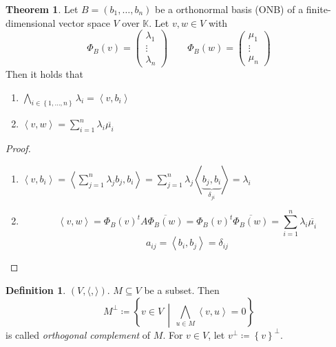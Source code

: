 \documentclass[a4paper,landscape,twocolumn]{article}
\newcommand\set[1]{\left\{#1\right\}}
\newcommand\setdef[2]{\left\{#1\,\middle|\,#2\right\}}
\newcommand\functional[1]{\left\langle{#1}\right\rangle}
\theoremstyle{definition}
\newtheorem{theorem}{Theorem}
\newtheorem{defi}{Definition}
\begin{document}
\begin{theorem}
  \label{satz-8.39}
  Let $B = (b_1, \ldots, b_n)$ be a orthonormal basis (ONB)
  of a finite-dimensional vector space $V$ over $\mathbb K$.
  Let $v,w \in V$ with
  \[
    \Phi_B(v) = \begin{pmatrix} \lambda_1 \\ \vdots \\ \lambda_n \end{pmatrix}
    \qquad
    \Phi_B(w) = \begin{pmatrix} \mu_1 \\ \vdots \\ \mu_n \end{pmatrix}
  \]
  Then it holds that
  \begin{enumerate}
    \item $\bigwedge_{i \in \set{1,\ldots,n}} \lambda_i = \functional{v,b_i}$
    \item $\functional{v,w} = \sum_{i=1}^n \lambda_i \overline{\mu_i}$
  \end{enumerate}
\end{theorem}
\begin{proof}
  \begin{enumerate}
    \item $\functional{v,b_i} = \functional{\sum_{j=1}^n \lambda_j b_j, b_i} = \sum_{j=1}^n \lambda_j \functional{\underbrace{b_j, b_i}_{\delta_{ji}}} = \lambda_i$
    \item
      \[
        \functional{v,w} = \Phi_B(v)^t A \overline{\Phi_B(w)} = \Phi_B(v)^t \overline{\Phi_B(w)} = \sum_{i=1}^n \lambda_i \overline{\mu_i}
      \] \[
        a_{ij} = \functional{b_i, b_j} = \delta_{ij}
      \]
  \end{enumerate}
\end{proof}

\begin{defi}
  \label{defi-8.40}
  $(V, \langle, \rangle)$. $M \subseteq V$ be a subset.
  Then
  \[ M^\bot \coloneqq \setdef{v \in V}{\bigwedge_{u \in M} \functional{v,u} = 0} \]
  is called \emph{orthogonal complement} of $M$. For $v \in V$, let $v^\bot \coloneqq \set{v}^\bot$.
\end{defi}
\end{document}
